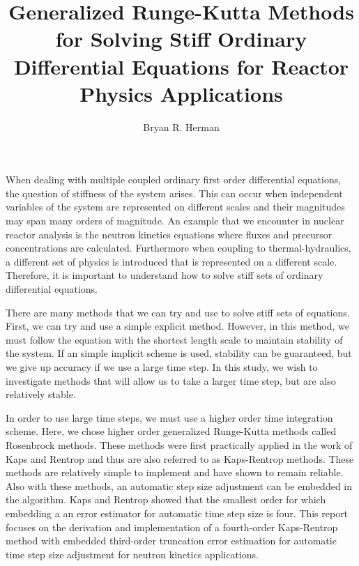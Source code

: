\documentclass{ansconf}
\numberwithin{equation}{section}
\begin{document}
\title{Generalized Runge-Kutta Methods for Solving Stiff Ordinary Differential Equations for Reactor Physics Applications}

\author{Bryan R. Herman}

\maketitle
\thispagestyle{empty}


When dealing with multiple coupled ordinary first order differential equations, the question of stiffness of the system arises. This can occur when independent variables of the system are represented on different scales and their magnitudes may span many orders of magnitude. An example that we encounter in nuclear reactor analysis is the neutron kinetics equations where fluxes and precursor concentrations are calculated. Furthermore when coupling to thermal-hydraulics, a different set of physics is introduced that is represented on a different scale. Therefore, it is important to understand how to solve stiff sets of ordinary differential equations.

There are many methods that we can try and use to solve stiff sets of equations. First, we can try and use a simple explicit method. However, in this method, we must follow the equation with the shortest length scale to maintain stability of the system. If an simple implicit scheme is used, stability can be guaranteed, but we give up accuracy if we use a large time step. In this study, we wish to investigate methods that will allow us to take a larger time step, but are also relatively stable. 

In order to use large time steps, we must use a higher order time integration scheme. Here, we chose higher order generalized Runge-Kutta methods called Rosenbrock methods. These methods were first practically applied in the work of Kaps and Rentrop and thus are also referred to as Kaps-Rentrop methods. These methods are relatively simple to implement and have shown to remain reliable. Also with these methods, an automatic step size adjustment can be embedded in the algorithm. Kaps and Rentrop showed that the smallest order for which embedding a an error estimator for automatic time step size is four. This report focuses on the derivation and implementation of a fourth-order Kaps-Rentrop method with embedded third-order truncation error estimation for automatic time step size adjustment for neutron kinetics applications.
\end{document}
